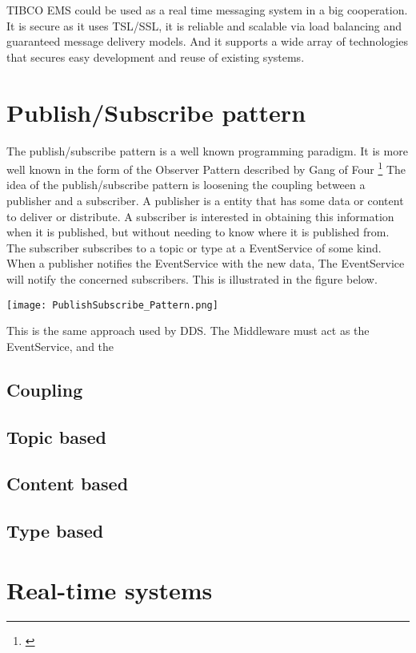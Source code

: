 TIBCO EMS could be used as a real time messaging system in a big cooperation. It is secure as it uses TSL/SSL, it is reliable and scalable via load balancing and guaranteed message delivery models. And it supports a wide array of technologies that secures easy development and reuse of existing systems.

\section{Publish/Subscribe pattern}
The publish/subscribe pattern is a well known programming paradigm. It is more well known in the form of the Observer Pattern described by Gang of Four \footnote{\citep{DesignPatterns}}
The idea of the publish/subscribe pattern is loosening the coupling between a publisher and a subscriber. A publisher is a entity that has some data or content to deliver or distribute. A subscriber is interested in obtaining this information when it is published, but without needing to know where it is published from.
The subscriber subscribes to a topic or type at a EventService of some kind. When a publisher notifies the EventService with the new data, The EventService will notify the concerned subscribers. This is illustrated in the figure below.

\begin{center}
	\texttt{[image: PublishSubscribe\_Pattern.png]}
\end{center}

This is the same approach used by DDS. The Middleware must act as the EventService, and the 

\subsection{Coupling}


\subsection{Topic based}
\subsection{Content based}
\subsection{Type based}


\section{Real-time systems}


